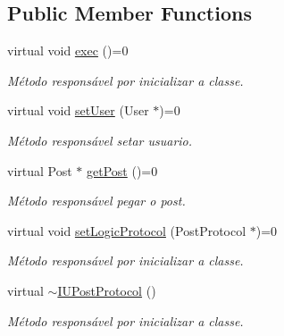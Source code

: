 \subsection*{Public Member Functions}
\begin{DoxyCompactItemize}
\item 
\hypertarget{class_i_u_post_protocol_a918e56d6c181b995b174f76bce262550}{virtual void \hyperlink{class_i_u_post_protocol_a918e56d6c181b995b174f76bce262550}{exec} ()=0}\label{class_i_u_post_protocol_a918e56d6c181b995b174f76bce262550}

\begin{DoxyCompactList}\small\item\em Método responsável por inicializar a classe. \end{DoxyCompactList}\item 
\hypertarget{class_i_u_post_protocol_ac09c65f4441d28a95e8e620529ebf1ac}{virtual void \hyperlink{class_i_u_post_protocol_ac09c65f4441d28a95e8e620529ebf1ac}{set\-User} (User $\ast$)=0}\label{class_i_u_post_protocol_ac09c65f4441d28a95e8e620529ebf1ac}

\begin{DoxyCompactList}\small\item\em Método responsável setar usuario. \end{DoxyCompactList}\item 
\hypertarget{class_i_u_post_protocol_abd965d8b629bcbe9171e4783c2469c4a}{virtual Post $\ast$ \hyperlink{class_i_u_post_protocol_abd965d8b629bcbe9171e4783c2469c4a}{get\-Post} ()=0}\label{class_i_u_post_protocol_abd965d8b629bcbe9171e4783c2469c4a}

\begin{DoxyCompactList}\small\item\em Método responsável pegar o post. \end{DoxyCompactList}\item 
\hypertarget{class_i_u_post_protocol_a2eb127e73ef91e53f1fbc30b70438d2e}{virtual void \hyperlink{class_i_u_post_protocol_a2eb127e73ef91e53f1fbc30b70438d2e}{set\-Logic\-Protocol} (Post\-Protocol $\ast$)=0}\label{class_i_u_post_protocol_a2eb127e73ef91e53f1fbc30b70438d2e}

\begin{DoxyCompactList}\small\item\em Método responsável por inicializar a classe. \end{DoxyCompactList}\item 
\hypertarget{class_i_u_post_protocol_ab0196d108873247439673b8dbcc9d1ee}{virtual \hyperlink{class_i_u_post_protocol_ab0196d108873247439673b8dbcc9d1ee}{$\sim$\-I\-U\-Post\-Protocol} ()}\label{class_i_u_post_protocol_ab0196d108873247439673b8dbcc9d1ee}

\begin{DoxyCompactList}\small\item\em Método responsável por inicializar a classe. \end{DoxyCompactList}\end{DoxyCompactItemize}


